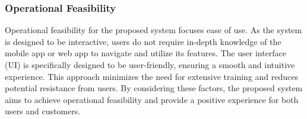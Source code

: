 \documentclass{article}
\begin{document}
\subsubsection{Operational Feasibility}
Operational feasibility for the proposed system focuses ease of use. As the system is designed to be interactive, users do not require in-depth knowledge of the mobile app or web app to navigate and utilize its features. The user interface (UI) is specifically designed to be user-friendly, ensuring a smooth and intuitive experience. This approach minimizes the need for extensive training and reduces potential resistance from users.  By considering these factors, the proposed system aims to achieve operational feasibility and provide a positive experience for both users and customers.
\end{document}
